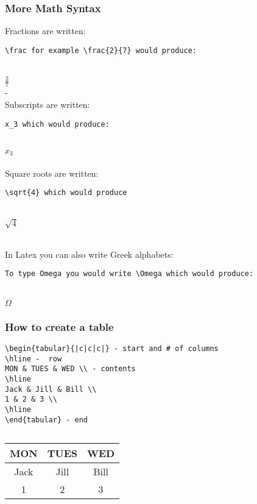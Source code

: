 \documentclass[aspectratio=1610]{beamer}
\begin{document}
\begin{frame}[fragile]
    \frametitle{More Math Syntax}
    Fractions are written: 
    \\
    \begin{verbatim}
\frac for example \frac{2}{7} would produce:

\end{verbatim}
\\
$\frac{2}{7}$
\\ - \\
Subscripts are written:
\\
\begin{verbatim}
x_3 which would produce:
\end{verbatim}
\\
$x_3$
\\ \\
Square roots are written: 
\begin{verbatim}
\sqrt{4} which would produce

\end{verbatim}
  \\
  $\sqrt{4}$

  \\
  In Latex you can also write Greek alphabets:
    \begin{verbatim}
To type Omega you would write \Omega which would produce:
\end{verbatim}
\\
$\Omega$
\\

\end{frame}

\begin{frame}[fragile]
    \frametitle{How to create a table}
      \begin{verbatim}
\begin{tabular}{|c|c|c|} - start and # of columns
\hline -  row
MON & TUES & WED \\ - contents
\hline
Jack & Jill & Bill \\
1 & 2 & 3 \\
\hline
\end{tabular} - end
      \end{verbatim}
    \begin{verbatim}

\end{verbatim}
   \begin{tabular}{|c|c|c|}
\hline
MON & TUES & WED \\
\hline
Jack & Jill & Bill \\
1 & 2 & 3 \\
\hline
\end{tabular}

\end{frame}
\end{document}
